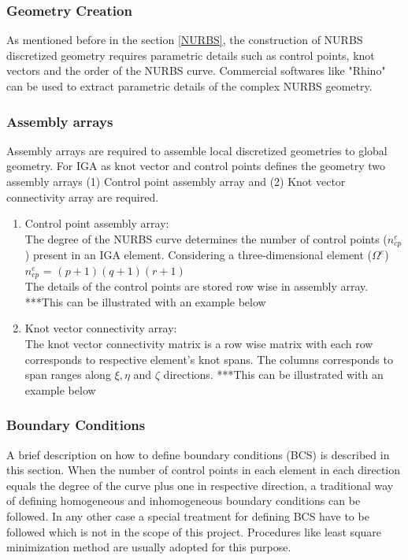 \documentclass[11pt]{article}
\begin{document}
\subsubsection{Geometry Creation}
As mentioned before in the section \ref{NURBS}, the construction of NURBS
discretized geometry requires parametric details such as control points, knot
vectors and the order of the NURBS curve. Commercial softwares like "Rhino" can
be used to extract parametric details of the complex NURBS geometry. \\
\subsubsection{Assembly arrays}
Assembly arrays are required to assemble local discretized geometries to global
geometry. For IGA as knot vector and control points defines the geometry two
assembly arrays (1) Control point assembly array and (2) Knot vector
connectivity array are required.
\begin{enumerate}[leftmargin=*]
	\item Control point assembly array: \\
	The degree of the NURBS curve determines the number of control points
	($n^e_{cp}$) present in an IGA element.
	Considering a three-dimensional element ($\Omega^e$)\\
	$n^e_{cp}$ = $(p+1)(q+1)(r+1)$ \\
	The details of the control points are stored row wise in assembly array.
	***This can be illustrated with an example below
	\item Knot vector connectivity array: \\
	The knot vector connectivity matrix is a row wise matrix with each row
	corresponds to respective element's knot spans. The columns corresponds to span
	ranges along $\xi, \eta$ and $\zeta$ directions.
	***This can be illustrated with an example below
\end{enumerate}
\subsubsection{Boundary Conditions}
A brief description on how to define boundary conditions (BCS) is described in this section. When the number of control points in each element in each direction equals the degree of the curve plus one in respective direction, a traditional way of defining homogeneous and inhomogeneous boundary conditions can be followed. In any other case a special treatment for defining BCS have to be followed which is not in the scope of this project. Procedures like least square minimization method are usually adopted for this purpose. 
\end{document}
